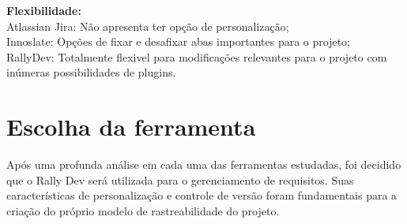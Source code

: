 \textbf{Flexibilidade:} \\
\tab Atlassian Jira: Não apresenta ter opção de personalização;\\
\tab Innoslate: Opções de fixar e desafixar abas importantes para o projeto;\\
\tab RallyDev: Totalmente flexivel para modificações relevantes para o projeto com inúmeras possibilidades de plugins.\\

\section {\large{Escolha da ferramenta}}

\tab Após uma profunda análise em cada uma das ferramentas estudadas, foi decidido que o Rally Dev será utilizada para o gerenciamento de requisitos. Suas características de personalização e controle de versão foram fundamentais para a criação do próprio modelo de rastreabilidade do projeto.  \\
